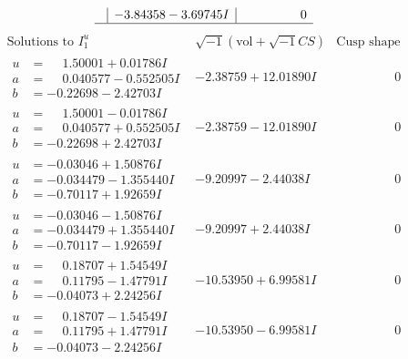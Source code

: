 \documentclass[1p]{elsarticle_modified}
\theoremstyle{definition}
\newcommand{\I}{\sqrt{-1}}
\begin{document}
$$\begin{array}{c|c|c}
 & -3.84358 - 3.69745 I & \phantom{-0.000000 } 0\\
 \hline 
 \end{array}$$\newpage$$\begin{array}{c|c|c}  
\text{Solutions to }I^u_{1}& \I (\text{vol} + \sqrt{-1}CS) & \text{Cusp shape}\\
 \hline 
\begin{aligned}
u &= \phantom{-}1.50001 + 0.01786 I \\
a &= \phantom{-}0.040577 - 0.552505 I \\
b &= -0.22698 - 2.42703 I\end{aligned}
 & -2.38759 + 12.01890 I & \phantom{-0.000000 } 0 \\ \hline\begin{aligned}
u &= \phantom{-}1.50001 - 0.01786 I \\
a &= \phantom{-}0.040577 + 0.552505 I \\
b &= -0.22698 + 2.42703 I\end{aligned}
 & -2.38759 - 12.01890 I & \phantom{-0.000000 } 0 \\ \hline\begin{aligned}
u &= -0.03046 + 1.50876 I \\
a &= -0.034479 - 1.355440 I \\
b &= -0.70117 + 1.92659 I\end{aligned}
 & -9.20997 - 2.44038 I & \phantom{-0.000000 } 0 \\ \hline\begin{aligned}
u &= -0.03046 - 1.50876 I \\
a &= -0.034479 + 1.355440 I \\
b &= -0.70117 - 1.92659 I\end{aligned}
 & -9.20997 + 2.44038 I & \phantom{-0.000000 } 0 \\ \hline\begin{aligned}
u &= \phantom{-}0.18707 + 1.54549 I \\
a &= \phantom{-}0.11795 - 1.47791 I \\
b &= -0.04073 + 2.24256 I\end{aligned}
 & -10.53950 + 6.99581 I & \phantom{-0.000000 } 0 \\ \hline\begin{aligned}
u &= \phantom{-}0.18707 - 1.54549 I \\
a &= \phantom{-}0.11795 + 1.47791 I \\
b &= -0.04073 - 2.24256 I\end{aligned}
 & -10.53950 - 6.99581 I & \phantom{-0.000000 } 0 \\ \hline\begin{aligned}

\end{aligned}
\end{array}$$
\end{document}
